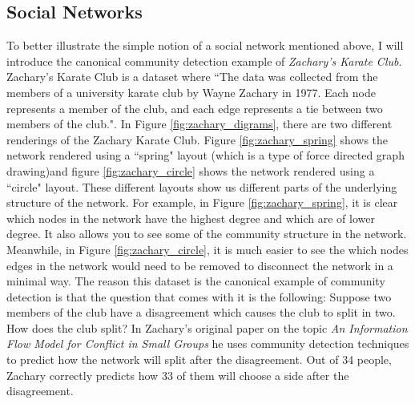 \subsection{Social Networks}\label{sec:Social Networks}
To better illustrate the simple notion of a social network mentioned above, I will introduce the canonical community detection example of \emph{Zachary's Karate Club}. Zachary's Karate Club is a dataset where ``The data was collected from the members of a university karate club by Wayne Zachary in 1977.  Each node represents a member of the club, and each edge represents a tie between two members of the club."\cite[Metadata]{konect:2017:ucidata-zachary}. In Figure \ref{fig:zachary_digrams}, there are two different renderings of the Zachary Karate Club. Figure \ref{fig:zachary_spring} shows the network rendered using a ``spring" layout (which is a type of force directed graph drawing\cite{kobourov12})and figure \ref{fig:zachary_circle} shows the network rendered using a ``circle" layout. These different layouts show us different parts of the underlying structure of the network. For example, in Figure \ref{fig:zachary_spring}, it is clear which nodes in the network have the highest degree and which are of lower degree. It also allows you to see some of the community structure in the network. Meanwhile, in Figure \ref{fig:zachary_circle}, it is much easier to see the which nodes edges in the network would need to be removed to disconnect the network in a minimal way. The reason this dataset is the canonical example of community detection is that the question that comes with it is the following: Suppose two members of the club have a disagreement which causes the club to split in two. How does the club split? In Zachary's original paper on the topic \emph{An Information Flow Model for Conflict in Small Groups}\cite{zachary77} he uses community detection techniques to predict how the network will split after the disagreement. Out of 34 people, Zachary correctly predicts how 33 of them will choose a side after the disagreement.

